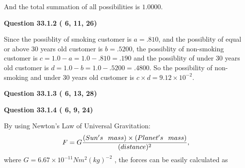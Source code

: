 \documentclass[12pt]{article}
\begin{document}
\noindent
And the total summation of all possibilities is $  %
1.0000 $.
 
 
 
 
  
\vspace{0.2in}
  
{\textbf{\Large{Question
33.1.2 
 (          6,         11,         26)
}}}
  
  
 
 

Since the possiblity of  %
smoking customer is $ a =  %
.810 $,
and the possiblity of  %
equal or above 30 years old customer is $ b =  %
.5200 $,
the possiblity of  %
non-smoking customer is $ c = 1.0 - a = 1.0 -
.810
=  %
.190 $ and the possiblity of  %
under 30 years old
customer is $ d = 1.0 - b = 1.0 -  %
.5200 =  %
.4800  $.
So the possibility of  %
 non-smoking and  %
under 30 years old
customer is $ c \times d =  %
9.12 \times 10^{-2} $.
 
 
 
  
\vspace{0.2in}
  
{\textbf{\Large{Question
33.1.3 
 (          6,         13,         28)
}}}
  
  
  
\vspace{0.2in}
  
{\textbf{\Large{Question
33.1.4 
 (          6,          9,         24)
}}}
  
  
 
 

By using Newton's Law of Universal Gravitation:
\[
F=G \frac{(Sun's \hspace{0.1in} mass) \times (Planet's \hspace{0.1in} mass)} { (distance)^2},
\]
where
$ G= %
6.67 \times 10^{-11}N m^{2}(kg)^{-2}$ , the forces can be easily calculated as
 
\vspace{0.2in}
 
\end{document}
